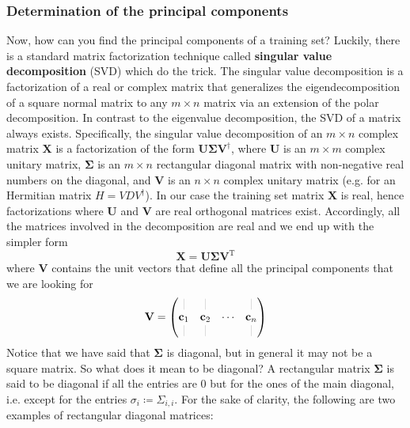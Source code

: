 \subsubsection{Determination of the principal components}
Now, how can you find the principal components of a training set? Luckily, there is a standard matrix factorization technique called \textbf{singular value decomposition} (SVD) which do the trick. The singular value decomposition is a factorization of a real or complex matrix that generalizes the eigendecomposition of a square normal matrix to any $m\times n$ matrix via an extension of the polar decomposition. In contrast to the eigenvalue decomposition, the SVD of a matrix always exists. Specifically, the singular value decomposition of an $m\times n$ complex matrix $\mathbf{X}$ is a factorization of the form $\mathbf{U}\boldsymbol{\Sigma}\mathbf{V}^\dagger$, where $\mathbf{U}$ is an $m\times m$ complex unitary matrix, $\boldsymbol{\Sigma}$ is an $m\times n$ rectangular diagonal matrix with non-negative real numbers on the diagonal, and $\mathbf{V}$ is an $n\times n$ complex unitary matrix (e.g. for an Hermitian matrix $H=VDV^\dagger$). In our case the training set matrix $\mathbf{X}$ is real, hence factorizations where $\mathbf{U}$ and $\mathbf{V}$ are real orthogonal matrices exist. Accordingly, all the matrices involved in the decomposition are real and we end up with the simpler form
\begin{equation}\label{SVD}
\mathbf{X}=\mathbf{U}\boldsymbol{\Sigma}\mathbf{V}^{\mathrm{T}}
\end{equation}
where $\mathbf{V}$ contains the unit vectors that define all the principal components that we are looking for
\begin{equation}
\mathbf{V}=\begin{pmatrix}
\color{gray!50}\mid & \color{gray!50}\mid & & \color{gray!50}\mid \\
\mathbf{c}_1 & \mathbf{c}_2 & \cdots & \mathbf{c}_n \\
\color{gray!50}\mid & \color{gray!50}\mid & & \color{gray!50}\mid
\end{pmatrix}
\end{equation}
Notice that we have said that $\boldsymbol{\Sigma}$ is diagonal, but in general it may not be a square matrix. So what does it mean to be diagonal? A rectangular matrix $\mathbf{\Sigma}$ is said to be diagonal if all the entries are 0 but for the ones of the main diagonal, i.e. except for the entries $\sigma_i\coloneqq\Sigma_{i,i}$. For the sake of clarity, the following are two examples of rectangular diagonal matrices:
